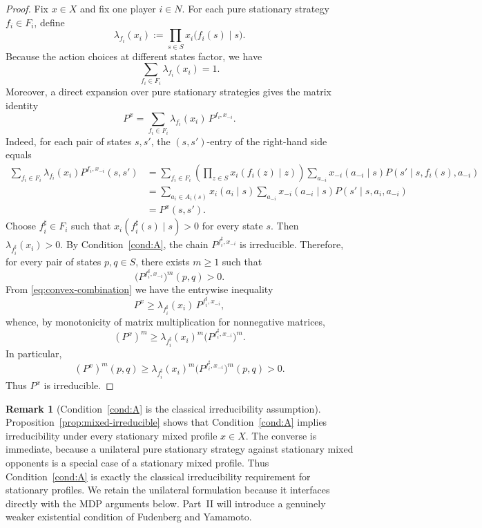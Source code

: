 \documentclass[11pt]{article}
\theoremstyle{definition}
\newtheorem{remark}[theorem]{Remark}
\newcommand{\1}{\mathbf{1}}
\begin{document}
\begin{proof}
Fix $x\in X$ and fix one player $i\in N$. For each pure stationary strategy $f_i\in F_i$, define
\[
\lambda_{f_i}(x_i):=\prod_{s\in S}x_i\bigl(f_i(s)\mid s\bigr).
\]
Because the action choices at different states factor, we have
\[
\sum_{f_i\in F_i}\lambda_{f_i}(x_i)=1.
\]
Moreover, a direct expansion over pure stationary strategies gives the matrix identity
\begin{equation}\label{eq:convex-combination}
P^x=\sum_{f_i\in F_i}\lambda_{f_i}(x_i)\,P^{f_i,x_{-i}}.
\end{equation}
Indeed, for each pair of states $s,s'$, the $(s,s')$-entry of the right-hand side equals
\begin{align*}
\sum_{f_i\in F_i}\lambda_{f_i}(x_i)P^{f_i,x_{-i}}(s,s')
&=\sum_{f_i\in F_i}\left(\prod_{z\in S}x_i(f_i(z)\mid z)\right)
\sum_{a_{-i}}x_{-i}(a_{-i}\mid s)P(s'\mid s,f_i(s),a_{-i})\\
&=\sum_{a_i\in A_i(s)}x_i(a_i\mid s)\sum_{a_{-i}}x_{-i}(a_{-i}\mid s)P(s'\mid s,a_i,a_{-i})\\
&=P^x(s,s').
\end{align*}
Choose $f_i^\sharp\in F_i$ such that $x_i(f_i^\sharp(s)\mid s)>0$ for every state $s$. Then $\lambda_{f_i^\sharp}(x_i)>0$. By Condition~\ref{cond:A}, the chain $P^{f_i^\sharp,x_{-i}}$ is irreducible. Therefore, for every pair of states $p,q\in S$, there exists $m\ge1$ such that
\[
\bigl(P^{f_i^\sharp,x_{-i}}\bigr)^m(p,q)>0.
\]
From \eqref{eq:convex-combination} we have the entrywise inequality
\[
P^x\ge \lambda_{f_i^\sharp}(x_i)\,P^{f_i^\sharp,x_{-i}},
\]
whence, by monotonicity of matrix multiplication for nonnegative matrices,
\[
(P^x)^m\ge \lambda_{f_i^\sharp}(x_i)^m\bigl(P^{f_i^\sharp,x_{-i}}\bigr)^m.
\]
In particular,
\[
(P^x)^m(p,q)\ge \lambda_{f_i^\sharp}(x_i)^m\bigl(P^{f_i^\sharp,x_{-i}}\bigr)^m(p,q)>0.
\]
Thus $P^x$ is irreducible.
\end{proof}

\begin{remark}[Condition~\ref{cond:A} is the classical irreducibility assumption]\label{rem:classical-irreducibility}
Proposition~\ref{prop:mixed-irreducible} shows that Condition~\ref{cond:A} implies irreducibility under every stationary mixed profile $x\in X$. The converse is immediate, because a unilateral pure stationary strategy against stationary mixed opponents is a special case of a stationary mixed profile. Thus Condition~\ref{cond:A} is exactly the classical irreducibility requirement for stationary profiles. We retain the unilateral formulation because it interfaces directly with the MDP arguments below. Part~II will introduce a genuinely weaker existential condition of Fudenberg and Yamamoto.
\end{remark}
\end{document}
